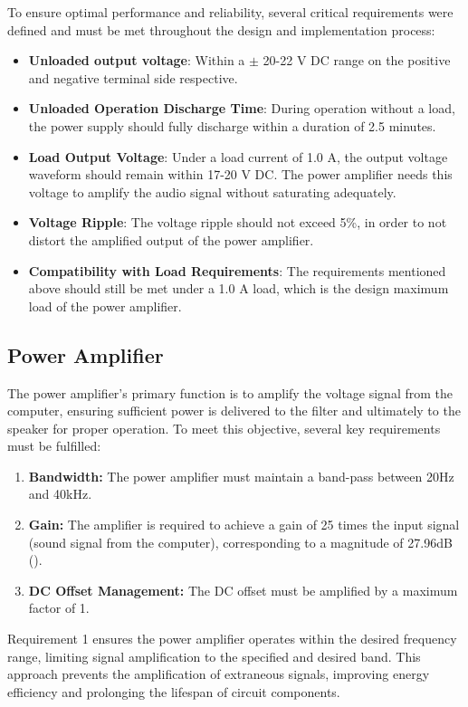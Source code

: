 To ensure optimal performance and reliability, several critical requirements were defined and must be met throughout the design and implementation process:

\begin{itemize}
    \item \textbf{Unloaded output voltage}: Within a $\pm$ 20-22 V DC range on the positive and negative terminal side respective.
    \item \textbf{Unloaded Operation Discharge Time}: During operation without a load, the power supply should fully discharge within a duration of 2.5 minutes. 
    \item \textbf{Load Output Voltage}: Under a load current of 1.0 A, the output voltage waveform should remain within 17-20 V DC. The power amplifier needs this voltage to amplify the audio signal without saturating adequately.
    \item \textbf{Voltage Ripple}: The voltage ripple should not exceed 5\%, in order to not distort the amplified output of the power amplifier.
    \item \textbf{Compatibility with Load Requirements}: The requirements mentioned above should still be met under a 1.0 A load, which is the design maximum load of the power amplifier.
\end{itemize}

\subsection{Power Amplifier}
The power amplifier's primary function is to amplify the voltage signal from the computer, ensuring sufficient power is delivered to the filter and ultimately to the speaker for proper operation. To meet this objective, several key requirements must be fulfilled:
\begin{enumerate}
\label{requirements PA}
    \item \textbf{Bandwidth:} The power amplifier must maintain a band-pass between 20Hz and 40kHz. 
    \item \textbf{Gain:} The amplifier is required to achieve a gain of 25 times the input signal (sound signal from the computer), corresponding to a magnitude of 27.96dB (). 
    \item \textbf{DC Offset Management:} The DC offset must be amplified by a maximum factor of 1. 
\end{enumerate}
Requirement 1 ensures the power amplifier operates within the desired frequency range, limiting signal amplification to the specified and desired band. This approach prevents the amplification of extraneous signals, improving energy efficiency and prolonging the lifespan of circuit components.

